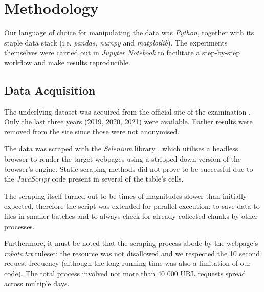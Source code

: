 \section{Methodology}

Our language of choice for manipulating the data was \emph{Python}, together with its staple data stack (i.e. \emph{pandas, numpy} and \emph{matplotlib}). The experiments themselves were carried out in \emph{Jupyter Notebook} to facilitate a step-by-step workflow and make results reproducible.


\subsection{Data Acquisition}

The underlying dataset was acquired from the official site of the examination \cite{bactable}. Only the last three years (2019, 2020, 2021) were available. Earlier results were removed from the site since those were not anonymised.

The data was scraped with the \emph{Selenium} library \cite{selenium}, which utilises a headless browser to render the target webpages using a stripped-down version of the browser's engine. Static scraping methods did not prove to be successful due to the \emph{JavaScript} code present in several of the table's cells.

The scraping itself turned out to be times of magnitudes slower than initially expected, therefore the script was extended for parallel execution: to save data to files in smaller batches and to always check for already collected chunks by other processes.

Furthermore, it must be noted that the scraping process abode by the webpage's \emph{robots.txt} ruleset: the resource was not disallowed and we respected the 10 second request frequency (although the long running time was also a limitation of our code). The total process involved not more than 40 000 URL requests spread across multiple days.
